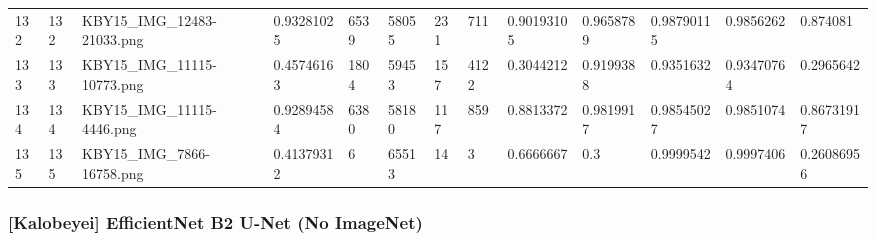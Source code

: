 \documentclass[11pt, a4paper, twoside]{report}
\begin{document}
\begin{longtable}[c]{@{}lllllllllllll@{}}
132 & 132 & KBY15\_IMG\_12483-21033.png & 0.93281025 & 6539 & 58055 & 231 & 711 & 0.90193105 & 0.9658789 & 0.98790115 & 0.9856262 & 0.874081 \\
133 & 133 & KBY15\_IMG\_11115-10773.png & 0.45746163 & 1804 & 59453 & 157 & 4122 & 0.3044212 & 0.9199388 & 0.9351632 & 0.93470764 & 0.2965642 \\
134 & 134 & KBY15\_IMG\_11115-4446.png & 0.92894584 & 6380 & 58180 & 117 & 859 & 0.8813372 & 0.9819917 & 0.98545027 & 0.9851074 & 0.86731917 \\
135 & 135 & KBY15\_IMG\_7866-16758.png & 0.41379312 & 6 & 65513 & 14 & 3 & 0.6666667 & 0.3 & 0.9999542 & 0.9997406 & 0.26086956 \\* \bottomrule
\end{longtable}

\newpage

\subsubsection{[Kalobeyei] EfficientNet B2 U-Net (No ImageNet)}
\end{document}

